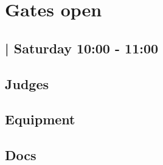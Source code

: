 \documentclass[10pt]{article}
\begin{document}
		\begin{minipage}{\linewidth}
		\setcounter{section}{16}
	\section{Gates open }
	\subsection*{ | Saturday 10:00 - 11:00}

	

	\begin{multicols}{2}
	\subsection*{\faUsers \: Judges}
	\begin{itemize}
		\end{itemize}
	\columnbreak
	\subsection*{\faWrench \: Equipment}
	        \vfill\null
        \subsection*{\faFile \: Docs}
     	\end{multicols}


	\vspace{1cm}
	\end{minipage}
\end{document}
